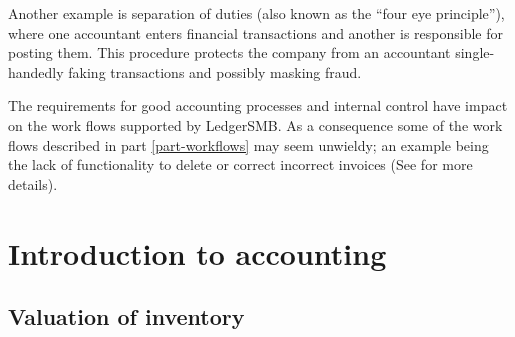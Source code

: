 Another example is separation of duties (also known as the ``four eye principle''),
where one accountant enters financial transactions and another is responsible for
posting them. This procedure protects the company from an accountant single-handedly
faking transactions and possibly masking fraud.

The requirements for good accounting processes and internal control have impact
on the work flows supported by LedgerSMB. As a consequence some of the work flows
described in part \ref{part-workflows} may seem unwieldy; an example being the
lack of functionality to delete or correct incorrect invoices (See  for more details).



\chapter{Introduction to accounting}
\label{cha-accounting-introduction}


\section{Valuation of inventory}
\label{sec-accounting-valuation-inventory}


